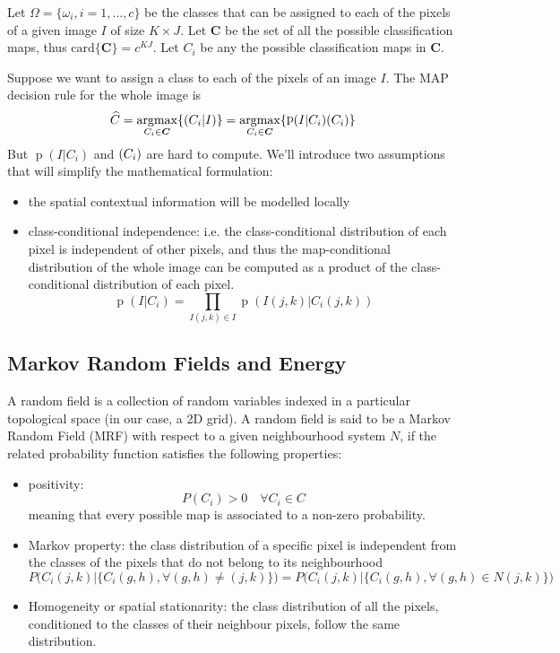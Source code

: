 \documentclass[oneside,onecolumn]{report}
\DeclareMathOperator*{\argmax}{argmax}
\DeclareMathOperator*{\pdf}{p}
\let\P\relax
\DeclareMathOperator*{\P}{P}
\begin{document}
Let $\Omega = \{\omega_i, i = 1, \dots, c\}$ be the classes that can be assigned to each of the pixels of a given image $I$ of size $K \times J$.
Let $\bm C$ be the set of all the possible classification maps, thus $\text{card}\{\bm C\} = c^{K J}$.
Let $C_i$ be any the possible classification maps in $\bm C$.

Suppose we want to assign a class to each of the pixels of an image $I$.
The MAP decision rule for the whole image is
$$ \widehat C = \argmax_{C_i \in \bm C}\{\P(C_i | I)\} = \argmax_{C_i \in \bm C}\{\pdf(I | C_i) \P(C_i) \} $$
But $\pdf(I | C_i)$ and $\P(C_i)$ are hard to compute.
We'll introduce two assumptions that will simplify the mathematical formulation:
\begin{itemize}
    \item the spatial contextual information will be modelled locally
    \item class-conditional independence: i.e. the class-conditional distribution of each pixel is independent of other pixels, and thus the map-conditional distribution of the whole image can be computed as a product of the class-conditional distribution of each pixel.
    $$ \pdf(I | C_i) = \prod_{I(j, k) \in I} \pdf(I(j, k) | C_i(j, k)) $$
\end{itemize}

\subsection{Markov Random Fields and Energy}
A random field is a collection of random variables indexed in a particular topological space (in our case, a 2D grid).
A random field is said to be a Markov Random Field (MRF) with respect to a given neighbourhood system $N$, if the related probability function satisfies the following properties:
\begin{itemize}
    \item positivity:
    $$ P(C_i) > 0 \quad \forall C_i \in C $$
    meaning that every possible map is associated to a non-zero probability.

    \item Markov property: the class distribution of a specific pixel is independent from the classes of the pixels that do not belong to its neighbourhood
    $$ P\Big(C_i(j, k) \Big| \big\{ C_i(g, h), \forall (g, h) \neq (j, k) \big\}\Big) =
    P\Big(C_i(j, k) \Big| \big\{ C_i(g, h), \forall (g, h) \in N(j, k) \big\}\Big) $$

    \item Homogeneity or spatial stationarity: the class distribution of all the pixels, conditioned to the classes of their neighbour pixels, follow the same distribution.
\end{itemize}
\end{document}
